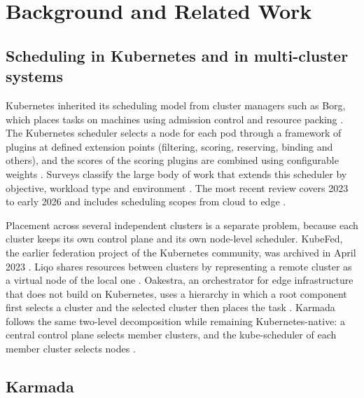 \section{Background and Related Work}\label{sec:related}

\subsection{Scheduling in Kubernetes and in multi-cluster systems}\label{sec:related-k8s}

Kubernetes inherited its scheduling model from cluster managers such as Borg, which places tasks on machines using admission control and resource packing \cite{verma2015borg}. The Kubernetes scheduler selects a node for each pod through a framework of plugins at defined extension points (filtering, scoring, reserving, binding and others), and the scores of the scoring plugins are combined using configurable weights \cite{k8s_scheduling_framework}. Surveys classify the large body of work that extends this scheduler by objective, workload type and environment \cite{carrion2022kubernetes,rejiba2022custom,senjab2023survey}. The most recent review covers 2023 to early 2026 and includes scheduling scopes from cloud to edge \cite{alhakimi2026enhancing}.

Placement across several independent clusters is a separate problem, because each cluster keeps its own control plane and its own node-level scheduler. KubeFed, the earlier federation project of the Kubernetes community, was archived in April 2023 \cite{kubefed_repo}. Liqo shares resources between clusters by representing a remote cluster as a virtual node of the local one \cite{iorio2023liquid}. Oakestra, an orchestrator for edge infrastructure that does not build on Kubernetes, uses a hierarchy in which a root component first selects a cluster and the selected cluster then places the task \cite{bartolomeo2023oakestra}. Karmada follows the same two-level decomposition while remaining Kubernetes-native: a central control plane selects member clusters, and the kube-scheduler of each member cluster selects nodes \cite{karmada_docs_architecture}.

\subsection{Karmada}\label{sec:related-karmada}

